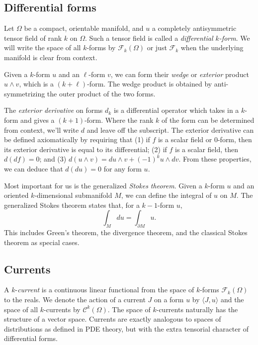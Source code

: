 \documentclass[twocolumn]{article}
\begin{document}
\subsection{Differential forms}

Let $\Omega$ be a compact, orientable manifold, and $u$ a completely antisymmetric tensor field of rank $k$ on $\Omega$.
Such a tensor field is called a \emph{differential $k$-form}.
We will write the space of all $k$-forms by $\mathscr{F}_k(\Omega)$ or just $\mathscr{F}_k$ when the underlying manifold is clear from context.

Given a $k$-form $u$ and an $\ell$-form $v$, we can form their \emph{wedge} or \emph{exterior} product $u \wedge v$, which is a $(k + \ell)$-form.
The wedge product is obtained by anti-symmetrizing the outer product of the two forms.

The \emph{exterior derivative} on forms $d_k$ is a differential operator which takes in a $k$-form and gives a $(k + 1)$-form.
Where the rank $k$ of the form can be determined from context, we'll write $d$ and leave off the subscript.
The exterior derivative can be defined axiomatically by requiring that (1) if $f$ is a scalar field or 0-form, then its exterior derivative is equal to its differential; (2) if $f$ is a scalar field, then $d(df) = 0$; and (3) $d(u \wedge v) = du\wedge v + (-1)^k u \wedge dv$.
From these properties, we can deduce that $d(du) = 0$ for any form $u$.

Most important for us is the generalized \emph{Stokes theorem}.
Given a $k$-form $u$ and an oriented $k$-dimensional submanifold $M$, we can define the integral of $u$ on $M$.
The generalized Stokes theorem states that, for a $k - 1$-form $u$,
\begin{equation}
    \int_Mdu = \int_{\partial M}u.
\end{equation}
This includes Green's theorem, the divergence theorem, and the classical Stokes theorem as special cases.

\subsection{Currents}

A $k$-\emph{current} is a continuous linear functional from the space of $k$-forms $\mathscr{F}_k(\Omega)$ to the reals.
We denote the action of a current $J$ on a form $u$ by $\langle J, u\rangle$ and the space of all $k$-currents by $\mathscr{C}^k(\Omega)$.
The space of $k$-currents naturally has the structure of a vector space.
Currents are exactly analogous to spaces of distributions as defined in PDE theory, but with the extra tensorial character of differential forms.
\end{document}

